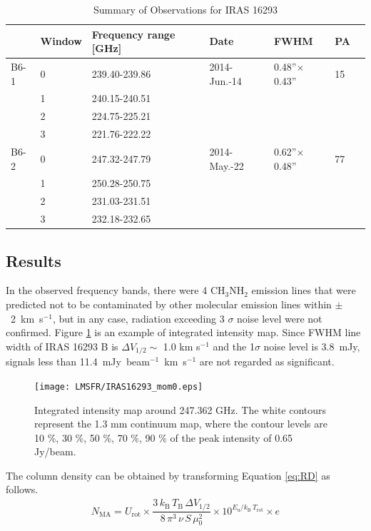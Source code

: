 \renewcommand{\arraystretch}{1.5}
\begin{table}[htb]
\begin{center}
  \caption{Summary of Observations for IRAS 16293}
  \label{tab:Obs_IRAS16293}
{\scriptsize
  \begin{tabular}{lllllll} \hline \hline
 & Window & Frequency range [GHz] & Date & FWHM & PA \\ \hline
 B6-1 & 0 & 239.40-239.86 & 2014-Jun.-14 & 0.48''$\times$0.43'' & 15\\
 & 1 & 240.15-240.51 & & & \\
 & 2 & 224.75-225.21 & & & \\
 & 3 & 221.76-222.22 & & & \\ \hline
 B6-2 & 0 & 247.32-247.79 & 2014-May.-22 & 0.62''$\times$0.48'' & 77\\
 & 1 & 250.28-250.75 & & & \\
 & 2 & 231.03-231.51 & & & \\
 & 3 & 232.18-232.65 & & & \\ \hline
  \end{tabular}
  }
\end{center}
\end{table}

\subsection{Results}
In the observed frequency bands, there were 4 CH$_{3}$NH$_{2}$ emission lines that were predicted not to be contaminated 
by other molecular emission lines within $\pm$~2~km~s$^{-1}$, 
but in any case, radiation exceeding 3 $\sigma$ noise level were not confirmed.
Figure \ref{IRAS16293_mom0} is an example of integrated intensity map.
Since FWHM line width of IRAS 16293 B is $\Delta V_{1/2} \sim$ 1.0 km s$^{-1}$ and the 1$\sigma$ noise level is 3.8~mJy, 
signals less than 11.4~mJy~beam$^{-1}$~km~s$^{-1}$ are not regarded as significant.

\begin{figure}[htp]
  \centering
  \texttt{[image: LMSFR/IRAS16293\_mom0.eps]}
  \caption{Integrated intensity map around 247.362 GHz. The white contours represent the 1.3 mm continuum map, where the contour levels are 10 \%, 30 \%, 50 \%, 70 \%, 90 \% of the peak intensity of 0.65 Jy/beam.}
  \label{IRAS16293_mom0}
\end{figure}

The column density can be obtained by transforming Equation \ref{eq:RD} as follows.
\begin{align}
N_{\mathrm{MA}} = U_{\mathrm{rot}} \times \dfrac{3\,k_{\mathrm{B}}\,T_{\mathrm{B}} \,\Delta V_{1/2}}{8\, \pi^3\, \nu\, S\, \mu_0^2} \times 10^{E_{\mathrm{u}}/k_{\mathrm{B}}\,T_{\mathrm{rot}}} \times e
\label{eq:N_MA}
\end{align}

